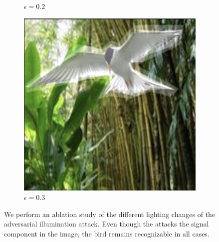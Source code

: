 \begin{figure}[!b]
\begin{subfigure}[b]{0.136\textwidth}
  \caption{$\epsilon = 0.2$}
  \label{fig:light_02}
\end{subfigure}
\begin{subfigure}[b]{0.136\textwidth}
  \includegraphics[width=0.99\linewidth]{plotsAistats/bird_light_03_light.png}
  \caption{$\epsilon = 0.3$}
  \label{fig:light_03}
\end{subfigure}
\caption{We perform an ablation study of the different lighting changes of the adversarial illumination attack. Even though the \nameofattack attacks the signal component in the image, the bird remains recognizable in all cases.}
\label{fig:light_panel}
\end{figure}


